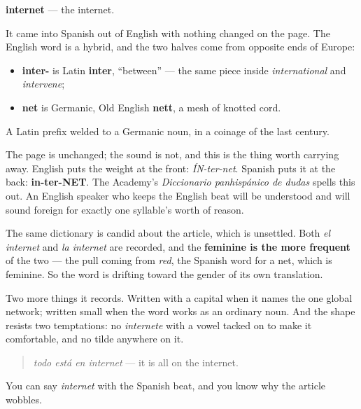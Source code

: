 \begin{cousinweb}
\textbf{internet} — the internet.

It came into Spanish out of English with nothing changed on the page. The English word is a hybrid, and the two halves come from opposite ends of Europe:

\begin{itemize}
\raggedright
  \item \textbf{inter-} is Latin \textbf{inter}, \textquotedblleft{}between\textquotedblright{} — the same piece inside \emph{international} and \emph{intervene};
  \item \textbf{net} is Germanic, Old English \textbf{nett}, a mesh of knotted cord.
\end{itemize}

A Latin prefix welded to a Germanic noun, in a coinage of the last century.

The page is unchanged; the sound is not, and this is the thing worth carrying away. English puts the weight at the front: \emph{ÍN-ter-net}. Spanish puts it at the back: \textbf{in-ter-NET}. The Academy's \emph{Diccionario panhispánico de dudas} spells this out. An English speaker who keeps the English beat will be understood and will sound foreign for exactly one syllable's worth of reason.

The same dictionary is candid about the article, which is unsettled. Both \emph{el internet} and \emph{la internet} are recorded, and the \textbf{feminine is the more frequent} of the two — the pull coming from \emph{red}, the Spanish word for a net, which is feminine. So the word is drifting toward the gender of its own translation.

Two more things it records. Written with a capital when it names the one global network; written small when the word works as an ordinary noun. And the shape resists two temptations: no \emph{internete} with a vowel tacked on to make it comfortable, and no tilde anywhere on it.

\begin{quote}
\emph{todo está en internet} — it is all on the internet.
\end{quote}
\end{cousinweb}

\begin{grammarlens}[title={What you've built}]
You can say \emph{internet} with the Spanish beat, and you know why the article wobbles.
\end{grammarlens}

